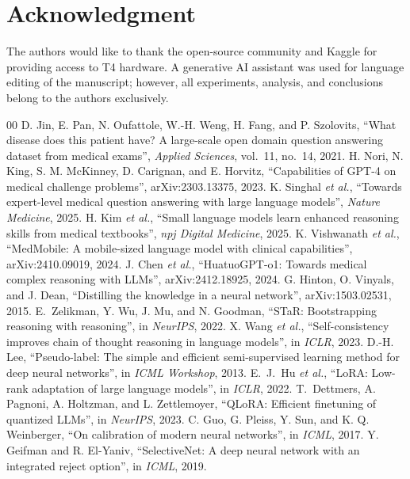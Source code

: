 \documentclass[conference]{IEEEtran}
\begin{document}
\section*{Acknowledgment}
The authors would like to thank the open-source community and Kaggle for providing access to T4 hardware. A generative AI assistant was used for language editing of the manuscript; however, all experiments, analysis, and conclusions belong to the authors exclusively.
\begin{thebibliography}{00}
 D. Jin, E. Pan, N. Oufattole, W.-H. Weng, H. Fang, and P. Szolovits, ``What disease does this patient have? A large-scale open domain question answering dataset from medical exams'', \emph{Applied Sciences}, vol.~11, no.~14, 2021.
 H. Nori, N. King, S. M. McKinney, D. Carignan, and E. Horvitz, ``Capabilities of GPT-4 on medical challenge problems'', arXiv:2303.13375, 2023.
 K. Singhal \emph{et al.}, ``Towards expert-level medical question answering with large language models'', \emph{Nature Medicine}, 2025.
 H. Kim \emph{et al.}, ``Small language models learn enhanced reasoning skills from medical textbooks'', \emph{npj Digital Medicine}, 2025.
 K. Vishwanath \emph{et al.}, ``MedMobile: A mobile-sized language model with clinical capabilities'', arXiv:2410.09019, 2024.
 J. Chen \emph{et al.}, ``HuatuoGPT-o1: Towards medical complex reasoning with LLMs'', arXiv:2412.18925, 2024.
 G. Hinton, O. Vinyals, and J. Dean, ``Distilling the knowledge in a neural network'', arXiv:1503.02531, 2015.
 E.~Zelikman, Y. Wu, J. Mu, and N. Goodman, ``STaR\@: Bootstrapping reasoning with reasoning'', in \emph{NeurIPS}, 2022.
 X. Wang \emph{et al.}, ``Self-consistency improves chain of thought reasoning in language models'', in \emph{ICLR}, 2023.
 D.-H. Lee, ``Pseudo-label: The simple and efficient semi-supervised learning method for deep neural networks'', in \emph{ICML Workshop}, 2013.
 E.~J.~Hu \emph{et al.}, ``LoRA\@: Low-rank adaptation of large language models'', in \emph{ICLR}, 2022.
 T.~Dettmers, A. Pagnoni, A. Holtzman, and L. Zettlemoyer, ``QLoRA\@: Efficient finetuning of quantized LLMs'', in \emph{NeurIPS}, 2023.
 C. Guo, G. Pleiss, Y. Sun, and K. Q. Weinberger, ``On calibration of modern neural networks'', in \emph{ICML}, 2017.
 Y. Geifman and R. El-Yaniv, ``SelectiveNet: A deep neural network with an integrated reject option'', in \emph{ICML}, 2019.

\end{thebibliography}
\end{document}
